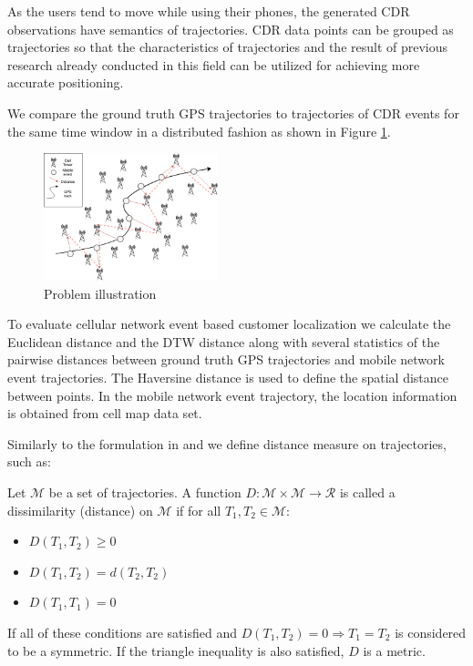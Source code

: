 As the users tend to move while using their phones, the generated CDR observations have semantics of trajectories. CDR data points can be grouped as trajectories so that the characteristics of trajectories and the result of previous research already conducted in this field can be utilized for achieving more accurate positioning.

We compare the ground truth GPS trajectories to trajectories of CDR events for the same time window in a distributed fashion as shown in Figure \ref{fig:problem}. 
\begin{figure}[h]
    \centering
    \includegraphics[width=0.45\textwidth]{images/problem.png}
    \caption{Problem illustration}
    \label{fig:problem}
\end{figure}

To evaluate cellular network event based customer localization we calculate the Euclidean distance and the DTW distance along with several statistics of the pairwise distances between ground truth GPS trajectories and mobile network event trajectories. The Haversine distance is used to define the spatial distance between points. In the mobile network event trajectory, the location information is obtained from cell map data set.

Similarly to the formulation in \cite{encyclopedia} and \cite{distance-def} we define distance measure on trajectories, such as:
\begin{definition}
Let $\mathcal{M}$ be a set of trajectories. A function $D :\mathcal{M} \times \mathcal{M} \rightarrow \mathcal{R}$  is called a dissimilarity (distance) on $\mathcal{M}$ if for all $T_{1}, T_{2} \in \mathcal{M}$: 
\begin{itemize}
    \item $D(T_{1},T_{2}) \geqslant 0$
    \item $D(T_{1},T_{2}) = d(T_{2},T_{2})$
    \item $D(T_{1},T_{1}) = 0$
\end{itemize}
If all of these conditions are satisfied and $D(T_{1}, T_{2}) = 0 \Rightarrow  T_{1} = T_{2} $ is considered to be a symmetric. If
the triangle inequality is also satisfied, $D$ is a metric.
\end{definition}

